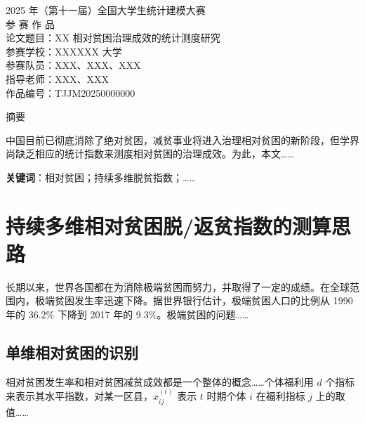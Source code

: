 \documentclass[12pt,a4paper]{article}
\begin{document}
\begin{titlepage}
    \begin{center}
        {\heiti{} 2025 年（第十一届）全国大学生统计建模大赛} \\
        \vspace{1cm}
        {\heiti{} 参 赛 作 品} \\
        \vspace{2cm}
        {\heiti{} 论文题目：XX 相对贫困治理成效的统计测度研究} \\
        \vspace{2cm}
        {\songti{} 参赛学校：XXXXXX 大学} \\
        {\songti{} 参赛队员：XXX、XXX、XXX} \\
        {\songti{} 指导老师：XXX、XXX} \\
        \vfill
        {\songti{} 作品编号：TJJM20250000000} \\
        \vspace{1cm}
    \end{center}
\end{titlepage}

\begin{center}
    {\heiti{} 摘要}
\end{center}
\noindent
中国目前已彻底消除了绝对贫困，减贫事业将进入治理相对贫困的新阶段，但学界尚缺乏相应的统计指数来测度相对贫困的治理成效。为此，本文……
\vspace{1em}

\noindent
\textbf{关键词}：相对贫困；持续多维脱贫指数；……

\newpage
\tableofcontents
\newpage

\section{持续多维相对贫困脱/返贫指数的测算思路}
长期以来，世界各国都在为消除极端贫困而努力，并取得了一定的成绩。在全球范围内，极端贫困发生率迅速下降。据世界银行估计，极端贫困人口的比例从 1990 年的 36.2\% 下降到 2017 年的 9.3\%。极端贫困的问题……

\subsection{单维相对贫困的识别}
相对贫困发生率和相对贫困减贫成效都是一个整体的概念……个体福利用 $d$ 个指标来表示其水平指数，对某一区县，$x_{ij}^{(t)}$ 表示 $t$ 时期个体 $i$ 在福利指标 $j$ 上的取值……
\end{document}
